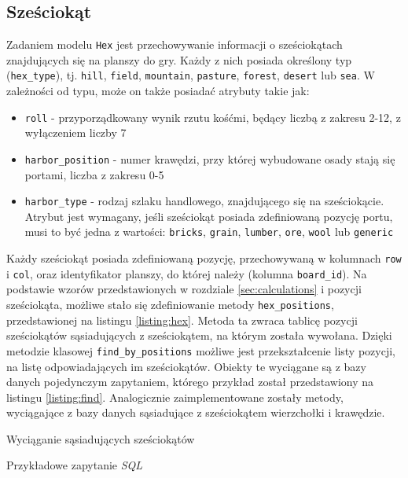 \documentclass[11pt,twoside]{report}
\begin{document}
\subsection{Sześciokąt}
Zadaniem modelu \texttt{Hex} jest przechowywanie informacji o
sześciokątach znajdujących się na planszy do gry. Każdy z nich posiada
określony typ (\texttt{hex\_type}), tj. \texttt{hill}, \texttt{field},
\texttt{mountain}, \texttt{pasture}, \texttt{forest}, \texttt{desert}
lub \texttt{sea}. W zależności od typu, może on także posiadać
atrybuty takie jak:

\begin{itemize}
\item \texttt{roll} - przyporządkowany wynik rzutu kośćmi, będący
  liczbą z zakresu 2-12, z wyłączeniem liczby 7
\item \texttt{harbor\_position} - numer krawędzi, przy której
  wybudowane osady stają się portami, liczba z zakresu 0-5
\item \texttt{harbor\_type} - rodzaj szlaku handlowego, znajdującego
  się na sześciokącie. Atrybut jest wymagany, jeśli sześciokąt posiada
  zdefiniowaną pozycję portu, musi to być jedna z wartości:
  \texttt{bricks}, \texttt{grain}, \texttt{lumber}, \texttt{ore},
  \texttt{wool} lub \texttt{generic}
\end{itemize}

Każdy sześciokąt posiada zdefiniowaną pozycję, przechowywaną w
kolumnach \texttt{row} i \texttt{col}, oraz identyfikator planszy, do
której należy (kolumna \texttt{board\_id}). Na podstawie wzorów
przedstawionych w rozdziale \ref{sec:calculations} i pozycji
sześciokąta, możliwe stało się zdefiniowanie metody
\texttt{hex\_positions}, przedstawionej na listingu
\ref{listing:hex}. Metoda ta zwraca tablicę pozycji sześciokątów
sąsiadujących z sześciokątem, na którym została wywołana. Dzięki
metodzie klasowej \texttt{find\_by\_positions} możliwe jest
przekształcenie listy pozycji, na listę odpowiadających im
sześciokątów. Obiekty te wyciągane są z bazy danych pojedynczym
zapytaniem, którego przykład został przedstawiony na listingu
\ref{listing:find}. Analogicznie zaimplementowane zostały metody,
wyciągające z bazy danych sąsiadujące z sześciokątem wierzchołki i
krawędzie.

\begin{listing}
  
  \caption{Wyciąganie sąsiadujących sześciokątów}
  \label{listing:hex}
\end{listing}

\begin{listing}
  
  \caption{Przykładowe zapytanie \emph{SQL}}
  \label{listing:find}
\end{listing}
\end{document}
